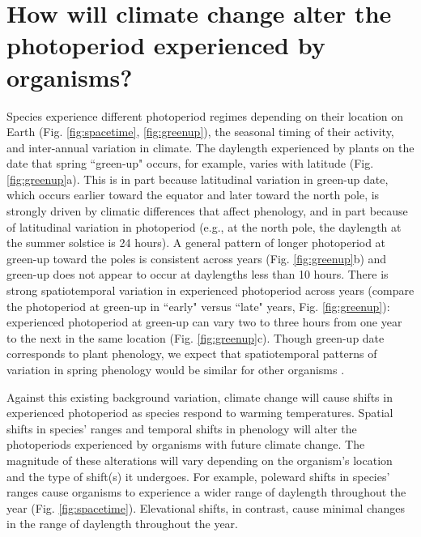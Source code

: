 \documentclass{article}
\begin{document}
\section*{How will climate change alter the photoperiod experienced by organisms?}
\par Species experience different photoperiod regimes depending on their location on Earth (Fig. \ref{fig:spacetime}, \ref{fig:greenup}), the seasonal timing of their activity, and inter-annual variation in climate. The daylength experienced by plants on the date that spring ``green-up" occurs, for example, varies with latitude (Fig. \ref{fig:greenup}a). This is in part because latitudinal variation in green-up date, which occurs earlier toward the equator and later toward the north pole, is strongly driven by climatic differences that affect phenology, and in part because of latitudinal variation in photoperiod (e.g., at the north pole, the daylength at the summer solstice is 24 hours). A general pattern of longer photoperiod at green-up toward the poles is consistent across years (Fig. \ref{fig:greenup}b) and green-up does not appear to occur at daylengths less than 10 hours. %
There is strong spatiotemporal variation in experienced photoperiod across years (compare the photoperiod at green-up in ``early" versus ``late" years, Fig. \ref{fig:greenup}): experienced photoperiod at green-up can vary two to three hours from one year to the next in the same location (Fig. \ref{fig:greenup}c). Though green-up date corresponds to plant phenology, we expect that spatiotemporal patterns of variation in spring phenology would be similar for other organisms \citep{ovaskainen2013, penuelas2002}.

\par Against this existing background variation, climate change will cause shifts in experienced photoperiod as species respond to warming temperatures. Spatial shifts in species' ranges and temporal shifts in phenology will alter the photoperiods experienced by organisms with future climate change. The magnitude of these alterations will vary depending on the organism's location and the type of shift(s) it undergoes. For example, poleward shifts in species' ranges cause organisms to experience a wider range of daylength throughout the year (Fig. \ref{fig:spacetime}). Elevational shifts, in contrast, cause minimal changes in the range of daylength throughout the year. %
\end{document}
